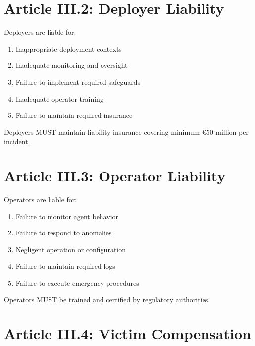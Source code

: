 \vspace{0.5cm}

\section{Article III.2: Deployer Liability}

\begin{articlebox}
Deployers are liable for:
\begin{enumerate}
    \item Inappropriate deployment contexts
    \item Inadequate monitoring and oversight
    \item Failure to implement required safeguards
    \item Inadequate operator training
    \item Failure to maintain required insurance
\end{enumerate}

Deployers MUST maintain liability insurance covering minimum €50 million per incident.
\end{articlebox}

\vspace{0.5cm}

\section{Article III.3: Operator Liability}

\begin{articlebox}
Operators are liable for:
\begin{enumerate}
    \item Failure to monitor agent behavior
    \item Failure to respond to anomalies
    \item Negligent operation or configuration
    \item Failure to maintain required logs
    \item Failure to execute emergency procedures
\end{enumerate}

Operators MUST be trained and certified by regulatory authorities.
\end{articlebox}

\vspace{0.5cm}

\section{Article III.4: Victim Compensation}

